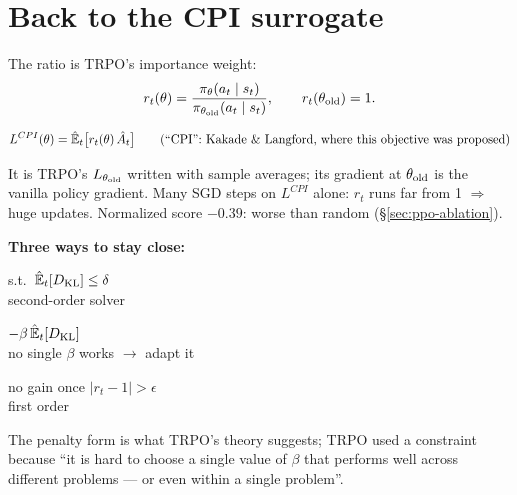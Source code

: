 \section{Back to the CPI surrogate}

The ratio is TRPO's importance weight:
\begin{gather*}
  r_t(\theta) = \frac{\pi_\theta(a_t\mid s_t)}{\pi_{\theta_{\mathrm{old}}}(a_t\mid s_t)}, \qquad r_t(\theta_{\mathrm{old}})=1.
\end{gather*}

\begin{eqbox}
\begin{gather*}
  L^{CPI}(\theta) = \hat{\mathbb{E}}_t\big[r_t(\theta)\,\hat A_t\big] \qquad \text{(``CPI'': Kakade \& Langford, where this objective was proposed)}
\end{gather*}
\end{eqbox}

{\small It is TRPO's $L_{\theta_{\mathrm{old}}}$ written with sample averages; its gradient at $\theta_{\mathrm{old}}$ is the vanilla policy gradient. Many SGD steps on $L^{CPI}$ alone: $r_t$ runs far from 1 $\Rightarrow$ huge updates. Normalized score $-0.39$: worse than random (\S\ref{sec:ppo-ablation}).}

\textbf{Three ways to stay close:}

\begin{pair}[3]
\begin{slatebox}[title={Constraint (TRPO)}]
\small s.t.\ $\hat{\mathbb{E}}_t[D_{\mathrm{KL}}]\le\delta$\\[2pt]
{\scriptsize second-order solver}
\end{slatebox}
\begin{warmbox}[title={Penalty (baseline)}]
\small $-\beta\,\hat{\mathbb{E}}_t[D_{\mathrm{KL}}]$\\[2pt]
{\scriptsize no single $\beta$ works $\to$ adapt it}
\end{warmbox}
\begin{coolbox}[title={Clip (``PPO'')}]
\small no gain once $|r_t-1|>\epsilon$\\[2pt]
{\scriptsize first order}
\end{coolbox}
\end{pair}

{\small The penalty form is what TRPO's theory suggests; TRPO used a constraint because ``it is hard to choose a single value of $\beta$ that performs well across different problems --- or even within a single problem''.}

